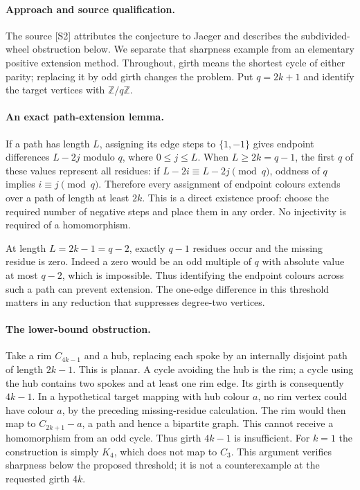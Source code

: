 \documentclass[11pt,a4paper]{article}
\begin{document}
\paragraph{Approach and source qualification.}
The source [S2] attributes the conjecture to Jaeger and describes the
subdivided-wheel obstruction below. We separate that sharpness example
from an elementary positive extension method. Throughout, girth means
the shortest cycle of either parity; replacing it by odd girth changes
the problem. Put $q=2k+1$ and identify the target vertices with
$\mathbb Z/q\mathbb Z$.

\paragraph{An exact path-extension lemma.}
If a path has length $L$, assigning its edge steps to $\{1,-1\}$ gives
endpoint differences $L-2j$ modulo $q$, where $0\le j\le L$.
When $L\ge2k=q-1$, the first $q$ of these values represent all residues:
if $L-2i\equiv L-2j\pmod q$, oddness of $q$ implies $i\equiv j\pmod q$.
Therefore every assignment of endpoint colours extends over a path of
length at least $2k$. This is a direct existence proof: choose the required
number of negative steps and place them in any order. No injectivity is
required of a homomorphism.

At length $L=2k-1=q-2$, exactly $q-1$ residues occur and the missing
residue is zero. Indeed a zero would be an odd multiple of $q$ with
absolute value at most $q-2$, which is impossible. Thus identifying the
endpoint colours across such a path can prevent extension. The one-edge
difference in this threshold matters in any reduction that suppresses
degree-two vertices.

\paragraph{The lower-bound obstruction.}
Take a rim $C_{4k-1}$ and a hub, replacing each spoke by an internally
disjoint path of length $2k-1$. This is planar. A cycle avoiding the hub
is the rim; a cycle using the hub contains two spokes and at least one
rim edge. Its girth is consequently $4k-1$. In a hypothetical target
mapping with hub colour $a$, no rim vertex could have colour $a$, by the
preceding missing-residue calculation. The rim would then map to
$C_{2k+1}-a$, a path and hence a bipartite graph. This cannot receive a
homomorphism from an odd cycle. Thus girth $4k-1$ is insufficient. For
$k=1$ the construction is simply $K_4$, which does not map to $C_3$.
This argument verifies sharpness below the proposed threshold; it is
not a counterexample at the requested girth $4k$.
\end{document}
